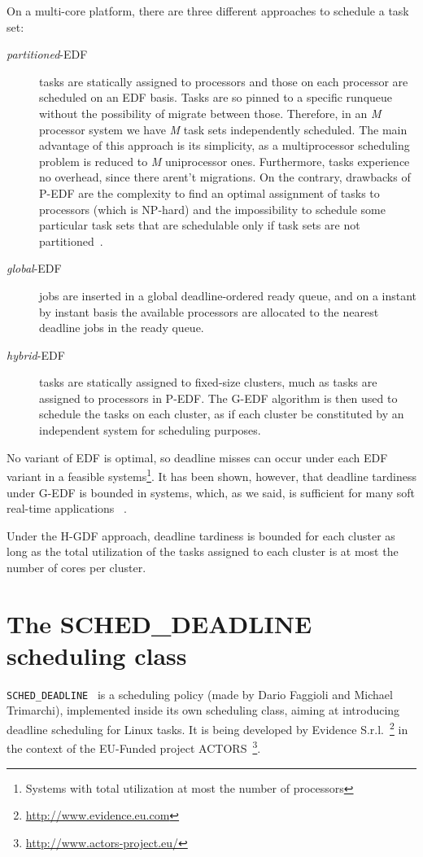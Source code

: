 On a multi-core platform, there are three different approaches to
schedule a task set:
\begin{description}
\item[\emph{partitioned}-EDF] tasks are statically assigned to
  processors and those on each processor are scheduled on an EDF
  basis. Tasks are so pinned to a specific runqueue without the
  possibility of migrate between those. Therefore, in an \emph{M}
  processor system we have \emph{M} task sets independently
  scheduled. The main advantage of this approach is its simplicity, as
  a multiprocessor scheduling problem is reduced to \emph{M}
  uniprocessor ones. Furthermore, tasks experience no overhead, since
  there arent't migrations. On the contrary, drawbacks of P-EDF are
  the complexity to find an optimal assignment of tasks to processors
  (which is NP-hard) and the impossibility to schedule some particular
  task sets that are schedulable only if task sets are not
  partitioned~\cite{HOS}.
\item[\emph{global}-EDF] jobs are inserted in a global
  deadline-ordered ready queue, and on a instant by instant basis the
  available processors are allocated to the nearest deadline jobs in
  the ready queue.
\item[\emph{hybrid}-EDF] tasks are statically assigned to fixed-size
  clusters, much as tasks are assigned to processors in P-EDF. The
  G-EDF algorithm is then used to schedule the tasks on each cluster,
  as if each cluster be constituted by an independent system for
  scheduling purposes.
\end{description}
No variant of EDF is optimal, so deadline misses can occur under each
EDF variant in a feasible systems\footnote{Systems with total
  utilization at most the number of processors}.  It has been shown,
however, that deadline tardiness under G-EDF is bounded in systems,
which, as we said, is sufficient for many soft real-time applications
~\cite{devi_tardiness, valente_lateness}.

Under the H-GDF approach, deadline tardiness is bounded for each
cluster as long as the total utilization of the tasks assigned to each
cluster is at most the number of cores per cluster.

\section{The
  SCHED\_DEADLINE scheduling class \label{sec:schedDead}}

\texttt{SCHED\_DEADLINE}~\cite{SCHEDDEAD} is a scheduling policy
(made by Dario Faggioli and Michael Trimarchi), implemented inside its
own scheduling class, aiming at introducing deadline scheduling for
Linux tasks.  It is being developed by Evidence
S.r.l.~\footnote{\url{http://www.evidence.eu.com}} in the context of
the EU-Funded project
ACTORS~\footnote{\url{http://www.actors-project.eu/}}.


